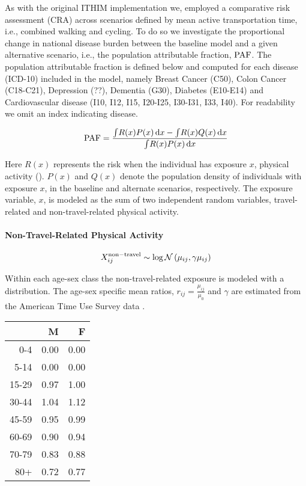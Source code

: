As with the original ITHIM implementation we, employed a comparative
risk assessment (CRA) across scenarios defined by mean active
transportation time, i.e., combined walking and cycling.  To do so we
investigate the proportional change in national disease burden between
the baseline model and a given alternative scenario, i.e., the
population attributable fraction, $\mathrm{PAF}$.  The population attributable
fraction is defined below and computed for each disease (ICD-10) included in
the model, namely Breast Cancer (C50), Colon Cancer (C18-C21), Depression (??), Dementia (G30),
Diabetes (E10-E14) and Cardiovascular disease (I10, I12, I15, I20-I25, I30-I31, I33, I40).  For readability we omit an index
indicating disease.

\begin{equation}
\mathrm{PAF} = \frac{\int \! R(x)P(x) \, \mathrm{d}x  - \int \! R(x)Q(x) \,
  \mathrm{d}x}{\int \! R(x)P(x) \, \mathrm{d}x} \label{paf}
\end{equation}

Here $R(x)$ represents the risk when the individual has exposure $x$,
physical activity (\mets).  $P(x)$ and $Q(x)$ denote the population
density of individuals with exposure $x$, in the baseline and
alternate scenarios, respectively.  The exposure variable, $x$, is
modeled as the sum of two independent random variables, travel-related
and non-travel-related physical activity.

\paragraph{Non-Travel-Related Physical Activity}

\begin{equation}
X_{ij}^{\mathrm{non-travel}} \sim \log\mathcal{N}\left(\mu_{ij}, \gamma \mu_{ij}\right)
\end{equation}

Within each age-sex class the non-travel-related exposure is modeled
with a \logNormal{} distribution.  The age-sex specific mean ratios,
$r_{ij} = \frac{\mu_{ij}}{\mu_0}$ and $\gamma$ are estimated from the
American Time Use Survey data \cite{ATUS}.

\begin{table}[ht]
\centering
\begin{tabular}{rrr}
  \hline
 & M & F \\
  \hline
0-4 & 0.00 & 0.00 \\
  5-14 & 0.00 & 0.00 \\
  15-29 & 0.97 & 1.00 \\
  30-44 & 1.04 & 1.12 \\
  45-59 & 0.95 & 0.99 \\
  60-69 & 0.90 & 0.94 \\
  70-79 & 0.83 & 0.88 \\
  80+ & 0.72 & 0.77 \\
   \hline
\end{tabular}
\end{table}

